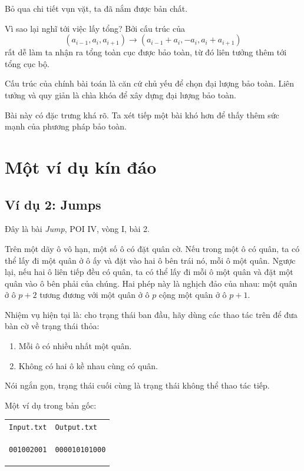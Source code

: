 \documentclass[11pt]{article}
\begin{document}
Bỏ qua chi tiết vụn vặt, ta đã nắm được bản chất.

Vì sao lại nghĩ tới việc lấy tổng? Bởi cấu trúc của
\[
  (a_{i-1},a_i,a_{i+1})
  \to
  (a_{i-1}+a_i,-a_i,a_i+a_{i+1})
\]
rất dễ làm ta nhận ra tổng toàn cục được bảo toàn, từ đó liên tưởng thêm tới
tổng cục bộ.

Cấu trúc của chính bài toán là căn cứ chủ yếu để chọn đại lượng bảo toàn.
Liên tưởng và quy giản là chìa khóa để xây dựng đại lượng bảo toàn.

Bài này có đặc trưng khá rõ. Ta xét tiếp một bài khó hơn để thấy thêm sức
mạnh của phương pháp bảo toàn.

\section{Một ví dụ kín đáo}

\subsection*{Ví dụ 2: Jumps}

Đây là bài \textit{Jump}, POI IV, vòng I, bài 2.

Trên một dãy ô vô hạn, một số ô có đặt quân cờ. Nếu trong một ô có quân, ta có
thể lấy đi một quân ở ô ấy và đặt vào hai ô bên trái nó, mỗi ô một quân.
Ngược lại, nếu hai ô liên tiếp đều có quân, ta có thể lấy đi mỗi ô một quân
và đặt một quân vào ô bên phải của chúng. Hai phép này là nghịch đảo của nhau:
một quân ở ô \(p+2\) tương đương với một quân ở ô \(p\) cộng một quân ở ô
\(p+1\).

Nhiệm vụ hiện tại là: cho trạng thái ban đầu, hãy dùng các thao tác trên để
đưa bàn cờ về trạng thái thỏa:
\begin{enumerate}
  \item Mỗi ô có nhiều nhất một quân.
  \item Không có hai ô kề nhau cùng có quân.
\end{enumerate}
Nói ngắn gọn, trạng thái cuối cùng là trạng thái không thể thao tác tiếp.

Một ví dụ trong bản gốc:
\begin{center}
\begin{tabular}{ll}
\texttt{Input.txt} & \texttt{Output.txt}\\
\begin{minipage}{0.35\linewidth}
\begin{verbatim}
001002001
\end{verbatim}
\end{minipage}
&
\begin{minipage}{0.45\linewidth}
\begin{verbatim}
000010101000
\end{verbatim}
\end{minipage}
\end{tabular}
\end{center}
\end{document}
